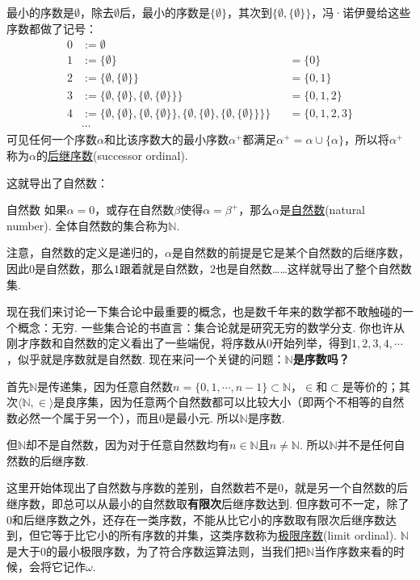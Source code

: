最小的序数是\(\emptyset\)，除去\(\emptyset\)后，最小的序数是\(\{\emptyset\}\)，其次到\(\{\emptyset,\{\emptyset\}\}\)，冯·诺伊曼给这些序数都做了记号：
\begin{align*}
    0 & := \emptyset &&\\
    1 & := \{\emptyset\} &&= \{0\}\\
    2 & := \{\emptyset,\{\emptyset\}\} &&= \{0,1\}\\
    3 & := \{\emptyset,\{\emptyset\},\{\emptyset,\{\emptyset\}\}\} &&= \{0,1,2\}\\
    4 & := \{\emptyset,\{\emptyset\},\{\emptyset,\{\emptyset\}\},\{\emptyset,\{\emptyset\},\{\emptyset,\{\emptyset\}\}\}\} &&= \{0,1,2,3\}\\
    & \cdots
\end{align*}
可见任何一个序数\(\alpha\)和比该序数大的最小序数\(\alpha^+\)都满足\(\alpha^+=\alpha \cup \{\alpha\}\)，所以将\(\alpha^+\)称为\(\alpha\)的\underline{后继序数}(successor ordinal).

这就导出了自然数：
\begin{definition}{自然数}
    如果\(\alpha=0\)，或存在自然数\(\beta\)使得\(\alpha=\beta^+\)，那么\(\alpha\)是\underline{自然数}(natural number). 全体自然数的集合称为\(\mathbb{N}\).
\end{definition}
注意，自然数的定义是递归的，\(\alpha\)是自然数的前提是它是某个自然数的后继序数，因此\(0\)是自然数，那么\(1\)跟着就是自然数，\(2\)也是自然数……这样就导出了整个自然数集.

\vspace{1cm}
现在我们来讨论一下集合论中最重要的概念，也是数千年来的数学都不敢触碰的一个概念：无穷. 一些集合论的书直言：集合论就是研究无穷的数学分支. 你也许从刚才序数和自然数的定义看出了一些端倪，将序数从\(0\)开始列举，得到\(1,2,3,4,\cdots\)，似乎就是序数就是自然数. 现在来问一个关键的问题：\(\mathbb{N}\)\textbf{是序数吗？}

首先\(\mathbb{N}\)是传递集，因为任意自然数\(n=\{0,1,\cdots,n-1\} \subset \mathbb{N}\)，\(\in\)和\(\subset\)是等价的；其次\(\langle \mathbb{N},\in \rangle\)是良序集，因为任意两个自然数都可以比较大小（即两个不相等的自然数必然一个属于另一个），而且\(0\)是最小元. 所以\(\mathbb{N}\)是序数.

但\(\mathbb{N}\)却不是自然数，因为对于任意自然数均有\(n \in \mathbb{N}\)且\(n \neq \mathbb{N}\). 所以\(\mathbb{N}\)并不是任何自然数的后继序数. 

这里开始体现出了自然数与序数的差别，自然数若不是\(0\)，就是另一个自然数的后继序数，即总可以从最小的自然数取\textbf{有限次}后继序数达到. 但序数可不一定，除了\(0\)和后继序数之外，还存在一类序数，不能从比它小的序数取有限次后继序数达到，但它等于比它小的所有序数的并集，这类序数称为\underline{极限序数}(limit ordinal). \(\mathbb{N}\)是大于\(0\)的最小极限序数，为了符合序数运算法则，当我们把\(\mathbb{N}\)当作序数来看的时候，会将它记作\(\omega\).


